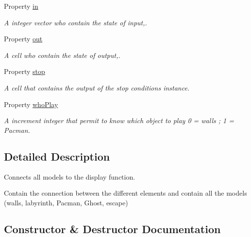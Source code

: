 \begin{DoxyCompactItemize}
Property \hyperlink{class_wrapper_a5e252d97ca5bf85c5753e2914673eead}{in}
\begin{DoxyCompactList}\small\item\em A integer vector who contain the state of input,. \end{DoxyCompactList}\item 
Property \hyperlink{class_wrapper_a8fcb5c64317d463be34f501200a2f49a}{out}
\begin{DoxyCompactList}\small\item\em A cell who contain the state of output,. \end{DoxyCompactList}\item 
Property \hyperlink{class_wrapper_ab453e11b3a41f7ef03be604bb5182e76}{stop}
\begin{DoxyCompactList}\small\item\em A cell that contains the output of the stop conditions instance. \end{DoxyCompactList}\item 
Property \hyperlink{class_wrapper_a19e8c1d68257003eba8e5a47c8302113}{who\+Play}
\begin{DoxyCompactList}\small\item\em A increment integer that permit to know which object to play 0 = walls ; 1 = Pacman. \end{DoxyCompactList}\end{DoxyCompactItemize}


\subsection{Detailed Description}
Connects all models to the display function. 

Contain the connection between the different elements and contain all the models (walls, labyrinth, Pacman, Ghost, escape) 

\subsection{Constructor \& Destructor Documentation}
\mbox{\label{class_wrapper_a0c4ac2d5799421f3db8cc95c90ffbde9}} 
